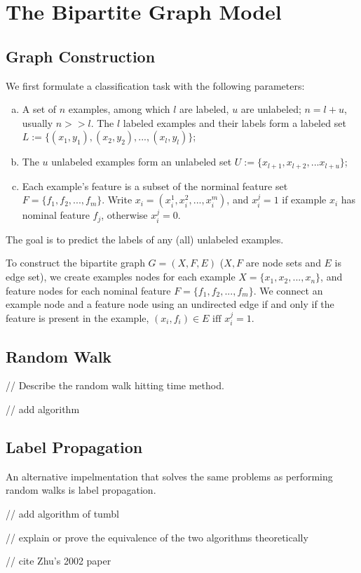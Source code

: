 \section{The Bipartite Graph Model}
\subsection{Graph Construction}

We first formulate a classification task with the following parameters:

\begin{enumerate}[a.]

    \item A set of $n$ examples, among which $l$ are labeled, $u$ are unlabeled;
        $n = l + u$, usually $n >> l$.
        The $l$ labeled examples and their labels form a labeled set 
        $L:= \{(x_1, y_1), (x_2, y_2), ..., (x_l, y_l)\}$;

    \item The $u$ unlabeled examples form an unlabeled set 
        $U:= \{x_{l+1}, x_{l+2}, ... x_{l+u}\}$; 

    \item Each example's feature is a subset of the norminal feature set 
        $F = \{f_1, f_2, ..., f_m\}$. 
        Write $x_i = (x_i^1, x_i^2, ..., x_i^m)$, and $x_i^j =
        1$ if example $x_i$ has nominal feature $f_j$, otherwise $x_i^j = 0$. 

\end{enumerate}
The goal is to predict the labels of any (all) unlabeled examples.

To construct the bipartite graph $G = (X, F, E)$ ($X, F$ are node sets and $E$
is edge set), we create examples nodes for each
example $X=\{x_1, x_2, ..., x_n\}$, and feature nodes for each nominal feature
$F=\{f_1, f_2, ..., f_m\}$.
We connect an example node and a feature node using an undirected
edge if and only if the feature is present in the example, $(x_i, f_i) \in E
\mbox{ iff } x_i^j = 1$.  


\subsection{Random Walk}

// Describe the random walk hitting time method.

// add algorithm


\subsection{Label Propagation}


An alternative impelmentation that solves the same problems as performing random
walks is label propagation.


// add algorithm of tumbl

// explain or prove the equivalence of the two algorithms theoretically

// cite Zhu's 2002 paper
